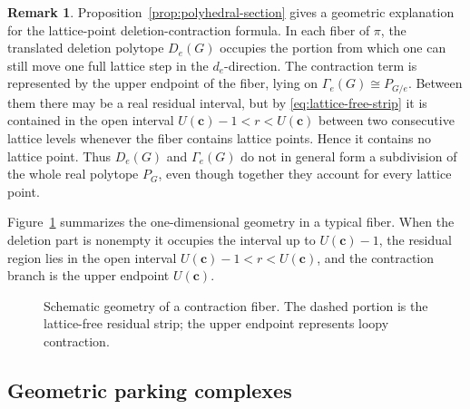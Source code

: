 \documentclass[11pt]{article}
\theoremstyle{plain}
\theoremstyle{definition}
\newtheorem{remark}[theorem]{Remark}
\newcommand{\bc}{\mathbf{c}}
\numberwithin{equation}{section}
\begin{document}
\begin{remark}\label{rem:one-step-geometry}
Proposition~\ref{prop:polyhedral-section} gives a geometric explanation for the
lattice-point deletion-contraction formula.  In each fiber of $\pi$, the
translated deletion polytope $D_e(G)$ occupies the portion from which one can
still move one full lattice step in the $d_e$-direction.  The contraction term
is represented by the upper endpoint of the fiber, lying on
$\Gamma_e(G)\cong P_{G/e}$.  Between them there may be a real residual interval, but by
\eqref{eq:lattice-free-strip} it is contained in the open interval
$U(\bc)-1<r<U(\bc)$ between two consecutive lattice levels whenever the
fiber contains lattice points.  Hence it contains no lattice point.  Thus
$D_e(G)$ and $\Gamma_e(G)$ do not in general form a subdivision of the whole
real polytope $P_G$, even though together they account for every lattice point.
\end{remark}

Figure~\ref{fig:contraction-fiber} summarizes the one-dimensional geometry in
a typical fiber.  When the deletion part is nonempty it occupies the interval up to
$U(\bc)-1$, the residual region lies in the open interval
$U(\bc)-1<r<U(\bc)$, and the contraction branch is the upper endpoint
$U(\bc)$.

\begin{figure}[ht]
\centering
{}
\caption{Schematic geometry of a contraction fiber.  The dashed portion is the
lattice-free residual strip; the upper endpoint represents loopy contraction.}
\label{fig:contraction-fiber}
\end{figure}

\subsection{Geometric parking complexes}
\label{subsec:geometric-parking}
\end{document}
